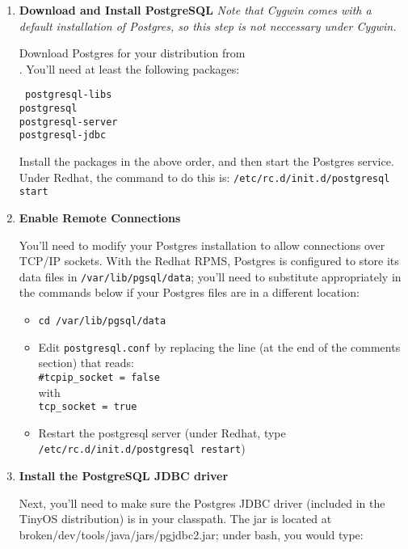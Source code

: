 \documentclass[11pt]{article}
\newcommand{\java}{broken/dev/tools/java}
\begin{document}
\begin{enumerate}
\item{\bf Download and Install PostgreSQL} {\it Note that Cygwin comes with a default installation of Postgres, so this step
is not neccessary under Cygwin.}

Download Postgres for your distribution from \\
.  
You'll need at least the following packages:

{\tt
postgresql-libs \\
postgresql \\
postgresql-server \\
postgresql-jdbc \\
}

Install the packages in the above order, and then start the Postgres service.  Under Redhat, the command to do this is:
{\tt /etc/rc.d/init.d/postgresql start}

\item{\bf Enable Remote Connections}

You'll need to modify your Postgres installation to allow connections over TCP/IP sockets.  With the Redhat RPMS, Postgres
is configured to store its data files in {\tt /var/lib/pgsql/data};  you'll need to substitute appropriately in the
commands below if your Postgres files are in a different location:

\begin{itemize}

\item {\tt cd /var/lib/pgsql/data}
\item Edit {\tt postgresql.conf} by
replacing the line (at the end of the comments section) that reads: \\
{\tt \#tcpip\_socket = false} \\
with \\
{\tt tcp\_socket = true} \\
\item Restart the postgresql server (under Redhat, type {\tt /etc/rc.d/init.d/postgresql restart})
\end{itemize}

\item{\bf Install the PostgreSQL JDBC driver}

Next, you'll need to make sure the Postgres JDBC driver (included in the TinyOS distribution) is in your classpath.  The
jar is located at \java/jars/pgjdbc2.jar;  under bash, you would type:


\end{enumerate}
\end{document}
